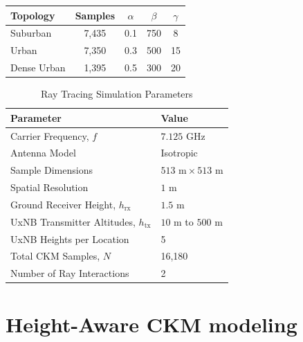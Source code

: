 \documentclass[10pt,conference,letterpaper]{IEEEtran}
\begin{document}
    \begin{center}
    \small
    \begin{tabular}{|l|c|c|c|c|}
    \hline
    {Topology} & {Samples} & $\alpha$ & $\beta$ {} & $\gamma$ \\ \hline
    Suburban    & 7,435 & 0.1 & 750 & 8  \\ \hline
    Urban       & 7,350 & 0.3 & 500 & 15 \\ \hline
    Dense Urban & 1,395 & 0.5 & 300 & 20 \\ \hline
    \end{tabular}
    \end{center}
\begin{table}[]
\centering
\caption{Ray Tracing Simulation Parameters}
\label{tab:rt_params}
\begin{tabular}{ll}
\hline
{Parameter} & {Value} \\ \hline
Carrier Frequency, $f$ & $7.125\text{~GHz}$ \\
Antenna Model & Isotropic \\
Sample Dimensions & $513\text{~m} \times 513\text{~m}$\\
Spatial Resolution & $1\text{~m}$ \\
Ground Receiver Height, $h_{\text{rx}}$ & $1.5\text{~m}$ \\
UxNB Transmitter Altitudes, $h_{\text{tx}}$ & $10\text{~m}$ to $500\text{~m}$ \\
UxNB Heights per Location & 5 \\
Total CKM Samples, $N$ & 16,180 \\
Number of Ray Interactions & 2 \\
\hline
\end{tabular}
\end{table}

\section{Height-Aware CKM modeling}\label{sec:ckm_model}
\end{document}
